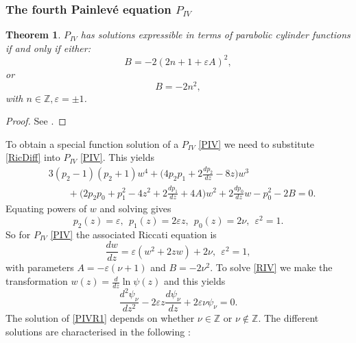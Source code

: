 \documentclass[12pt]{article}
\def\P{Painlev\'e }
\def\Z{\mathbb{Z}}
\newtheorem{mydef}{Theorem}[section]
\numberwithin{figure}{section}
\numberwithin{equation}{section}
\numberwithin{table}{section}
\begin{document}
\subsubsection{The fourth \P equation  $P_{IV}$}
\begin{mydef}
$P_{IV}$ has solutions expressible in terms of parabolic cylinder functions if and only if either:
$$B=-2(2n+1+\varepsilon A)^2,$$
or
$$B=-2n^2,$$
with $n\in\Z, \varepsilon=\pm1$.
\end{mydef}
\begin{proof}
See \cite{P:33:1,P:23:506,deGruyerCo,P:18:317,P:1:561,P:3:395}.
\end{proof}
To obtain a special function solution of a $P_{IV}$ \eqref{PIV} we need to substitute \eqref{RicDiff} into $P_{IV}$ \eqref{PIV}. This yields
\begin{align*}
&3(p_2-1)(p_2+1)w^4+\bigg(4p_2p_1+2\frac{dp_2}{dz}-8z\bigg)w^3\\
&\qquad+\bigg(2p_2p_0+p_1^2-4z^2+2\frac{dp_1}{dz}+4A\bigg)w^2+2\frac{dp_0}{dz}w-p_0^2-2B=0.
\end{align*}
Equating powers of $w$ and solving gives
$$p_2(z)=\varepsilon,~~p_1(z)=2\varepsilon z,~~p_0(z)=2\nu,~~\varepsilon^2=1.$$
So for $P_{IV}$ \eqref{PIV} the associated Riccati equation is
\begin{equation}
\frac{dw}{dz}=\varepsilon(w^2+2zw)+2\nu,~~\varepsilon^2=1,\label{RIV}
\end{equation}
with parameters $A=-\varepsilon(\nu+1)$ and $B=-2\nu^2$. To solve \eqref{RIV} we make the transformation $w(z)=\frac{d}{dz}\ln\psi(z)$ and this yields
\begin{equation}
\frac{d^2\psi_\nu}{dz^2}-2\varepsilon z\frac{d\psi_\nu}{dz}+2\varepsilon \nu\psi_\nu=0.\label{PIVR1}
\end{equation}
The solution of \eqref{PIVR1} depends on whether $\nu\in\Z$ or $\nu\not\in\Z$. The different solutions are characterised in the following \cite{P:PAC&KJ}:
\end{document}
